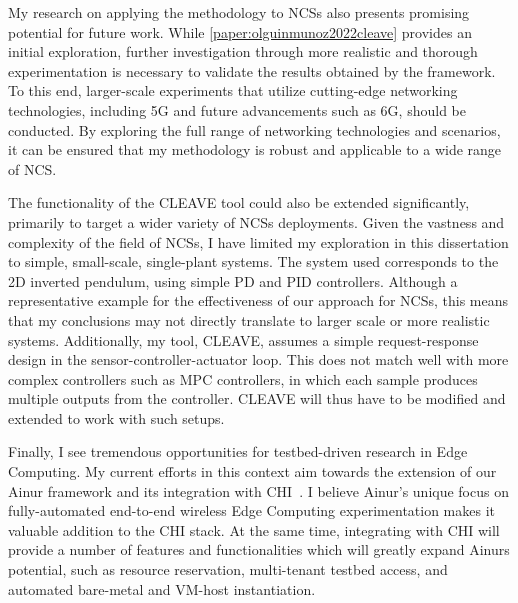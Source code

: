 My research on applying the methodology to \glspl{NCS} also presents promising potential for future work.
While \cref{paper:olguinmunoz2022cleave} provides an initial exploration, further investigation through more realistic and thorough experimentation is necessary to validate the results obtained by the framework.
To this end, larger-scale experiments that utilize cutting-edge networking technologies, including 5G and future advancements such as 6G, should be conducted.
By exploring the full range of networking technologies and scenarios, it can be ensured that my methodology is robust and applicable to a wide range of \gls{NCS}.

The functionality of the \gls{CLEAVE} tool could also be extended significantly, primarily to target a wider variety of \glspl{NCS} deployments.
Given the vastness and complexity of the field of \glspl{NCS}, I have limited my exploration in this dissertation to simple, small-scale, single-plant systems.
The system used corresponds to the \gls{2D} inverted pendulum, using simple \gls{PD} and \gls{PID} controllers.
Although a representative example for the effectiveness of our approach for \glspl{NCS}, this means that my conclusions may not directly translate to larger scale or more realistic systems.
Additionally, my tool, \gls{CLEAVE}, assumes a simple request-response design in the sensor-controller-actuator loop.
This does not match well with more complex controllers such as \gls{MPC} controllers, in which each sample produces multiple outputs from the controller.
\gls{CLEAVE} will thus have to be modified and extended to work with such setups.

Finally, I see tremendous opportunities for testbed-driven research in Edge Computing.
My current efforts in this context aim towards the extension of our Ainur framework and its integration with \gls{CHI}~\cite{keahey2020lessons}.
I believe Ainur's unique focus on fully-automated end-to-end wireless Edge Computing experimentation makes it valuable addition to the \gls{CHI} stack.
At the same time, integrating with \gls{CHI} will provide a number of features and functionalities which will greatly expand Ainurs potential, such as resource reservation, multi-tenant testbed access, and automated bare-metal and \gls{VM}-host instantiation.

